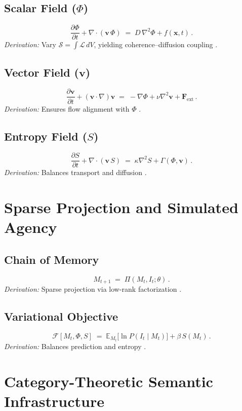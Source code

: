 \documentclass[12pt]{article}
\begin{document}
\subsection*{Scalar Field (\(\Phi\))}
\[
\frac{\partial \Phi}{\partial t} + \nabla \cdot (\mathbf{v}\,\Phi) \;=\; D\,\nabla^2 \Phi + f(\mathbf{x}, t) \, .
\]
\textit{Derivation:} Vary \(\mathcal{S}=\int \mathcal{L}\, dV\), yielding coherence–diffusion coupling \citep{atiyah1969, gromov1999}.

\subsection*{Vector Field (\(\mathbf{v}\))}
\[
\frac{\partial \mathbf{v}}{\partial t} + (\mathbf{v}\!\cdot\!\nabla)\mathbf{v} \;=\; -\nabla \Phi + \nu \nabla^2 \mathbf{v} + \mathbf{F}_{\text{ext}} \, .
\]
\textit{Derivation:} Ensures flow alignment with \(\Phi\) \citep{baez2011}.

\subsection*{Entropy Field (\(S\))}
\[
\frac{\partial S}{\partial t} + \nabla \cdot (\mathbf{v}\,S) \;=\; \kappa \nabla^2 S + \Gamma(\Phi, \mathbf{v}) \, .
\]
\textit{Derivation:} Balances transport and diffusion \citep{shannon1948, jaynes2003}.

\section*{Sparse Projection and Simulated Agency}
\subsection*{Chain of Memory}
\[
M_{t+1} \;=\; \Pi(M_t, I_t; \theta) \, .
\]
\textit{Derivation:} Sparse projection via low-rank factorization \citep{pearl2009, hohwy2013}.

\subsection*{Variational Objective}
\[
\mathcal{F}[M_t, \Phi, S] \;=\; \mathbb{E}_{M_t}\!\big[\ln P(I_t \mid M_t)\big] + \beta\, S(M_t) \, .
\]
\textit{Derivation:} Balances prediction and entropy \citep{friston2010, tononi2004}.

\section*{Category-Theoretic Semantic Infrastructure}
\end{document}
